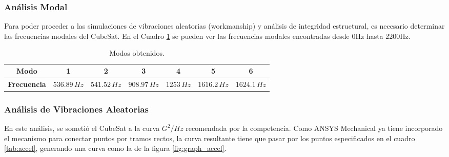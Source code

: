     \subsubsection{Análisis Modal}

      Para poder proceder a las simulaciones de vibraciones aleatorias (workmanship) y análisis de integridad
      estructural, es necesario determinar las frecuencias modales del CubeSat. En el Cuadro \ref{tab:modos_obtenidos}
      se pueden ver las frecuencias modales encontradas desde 0Hz hasta 2200Hz.

      \begin{table}[H]
      \centering
      \begin{tabular}{|c|c|c|c|c|c|c|}
      \hline
      \textbf{Modo}       & 1           & 2           & 3           & 4         & 5           & 6          \\
      \hline
      \textbf{Frecuencia} & $536.89\,Hz$ & $541.52\,Hz$ & $908.97\,Hz$ & $1253\,Hz$ & $1616.2\,Hz$ & $1624.1\,Hz$ \\
      \hline
      \end{tabular}
      \caption{Modos obtenidos.}
      \label{tab:modos_obtenidos}
      \end{table}

    \subsubsection{Análisis de Vibraciones Aleatorias}

      En este análisis, se sometió el CubeSat a la curva $G^2/Hz$ recomendada por la competencia. Como ANSYS Mechanical
      ya tiene incorporado el mecanismo para conectar puntos por tramos rectos, la curva resultante tiene que pasar por
      los puntos especificados en el cuadro \ref{tab:accel}, generando una curva como la de la figura
      \ref{fig:graph_accel}.

